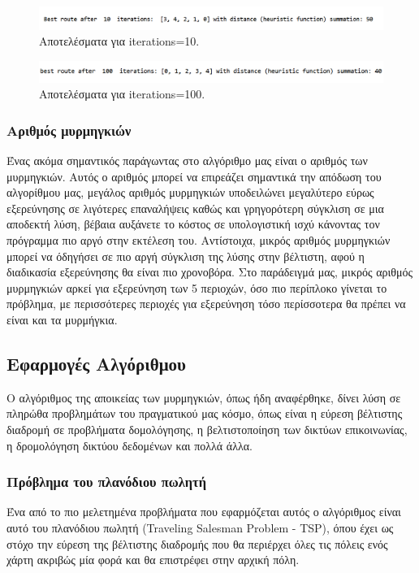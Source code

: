 \begin{figure}
    \centering
    \includegraphics[scale=0.55]{2947_thesis/pictures/ex5.png} 
    \caption{Αποτελέσματα για iterations=10.}
    \label{iter10}

\end{figure}
\begin{figure}
    \centering
    \includegraphics[scale=0.55]{2947_thesis/pictures/ex6.png} 
    \caption{Αποτελέσματα για iterations=100.}
    \label{iter100}
\end{figure}


\subsubsection{Αριθμός μυρμηγκιών}
Ένας ακόμα σημαντικός παράγωντας στο αλγόριθμο μας είναι ο αριθμός των μυρμηγκιών. Αυτός ο αριθμός μπορεί να επιρεάζει σημαντικά την απόδωση του αλγορίθμου μας, μεγάλος αριθμός μυρμηγκιών υποδειλώνει μεγαλύτερο εύρως εξερεύνησης σε λιγότερες επαναλήψεις καθώς και γρηγορότερη σύγκλιση σε μια αποδεκτή λύση, βέβαια αυξάνετε το κόστος σε υπολογιστική ισχύ κάνοντας τον πρόγραμμα πιο αργό στην εκτέλεση του. Αντίστοιχα, μικρός αριθμός μυρμηγκιών μπορεί να όδηγήσει σε πιο αργή σύγκλιση της λύσης στην βέλτιστη, αφού η διαδικασία εξερεύνησης θα είναι πιο χρονοβόρα. Στο παράδειγμά μας, μικρός αριθμός μυρμηγκιών αρκεί για εξερεύνηση των 5 περιοχών, όσο πιο περίπλοκο γίνεται το πρόβλημα, με περισσότερες περιοχές για εξερεύνηση τόσο περίσσοτερα θα πρέπει να είναι και τα μυρμήγκια. 


\subsection{Εφαρμογές Αλγόριθμου}
Ο αλγόριθμος της αποικείας των μυρμηγκιών, όπως ήδη αναφέρθηκε, δίνει λύση σε πληρώθα προβλημάτων του πραγματικού μας κόσμο, όπως είναι η εύρεση βέλτιστης διαδρομή σε προβλήματα δομολόγησης, η βελτιστοποίηση των δικτύων επικοινωνίας, η δρομολόγηση δικτύου δεδομένων και πολλά άλλα. 

\subsubsection{Πρόβλημα του πλανόδιου πωλητή}
Ένα από το πιο μελετημένα προβλήματα που εφαρμόζεται αυτός ο αλγόριθμος είναι αυτό του πλανόδιου πωλητή (Traveling Salesman Problem - TSP), όπου έχει ως στόχο την εύρεση της βέλτιστης διαδρομής που θα περιέρχει όλες τις πόλεις ενός χάρτη ακριβώς μία φορά και θα επιστρέφει στην αρχική πόλη. 

